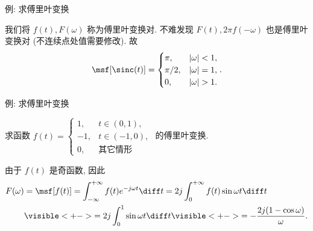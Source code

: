 \begin{frame}{例: 求傅里叶变换}
	\onslide<+->
	\begin{center}
	\end{center}
	\onslide<+->
	我们将 $f(t),F(\omega)$ 称为傅里叶变换对.
	\onslide<+->
	不难发现 $F(t),2\pi f(-\omega)$ 也是傅里叶变换对 (不连续点处值需要修改).
	\onslide<+->
	故
	\[\msf[\sinc(t)]=\begin{cases}
		\pi,&|\omega|<1,\\
		\pi/2,&|\omega|=1,\\
		0,&|\omega|>1.
		\end{cases}.\]
\end{frame}


\begin{frame}{例: 求傅里叶变换}
	\onslide<+->
	\begin{example}
		求函数 $f(t)=
			\begin{cases}
				1,&t\in(0,1),\\
				-1,&t\in(-1,0),\\
				0,&\text{其它情形}
			\end{cases}$
		的傅里叶变换.
	\end{example}

	\onslide<+->
	\begin{solution}
		由于 $f(t)$ 是奇函数, 因此
		\begin{align*}
			F(\omega)&=\msf[f(t)]
			=\int_{-\infty}^{+\infty}f(t)e^{-j\omega t}\diff t
			=2j\int_0^{+\infty}f(t)\sin{\omega t}\diff t\\
			&\visible<+->{=2j\int_0^1\sin{\omega t}\diff t}
			\visible<+->{=-\frac{2j(1-\cos\omega)}\omega.}
		\end{align*}
	\end{solution}
\end{frame}


